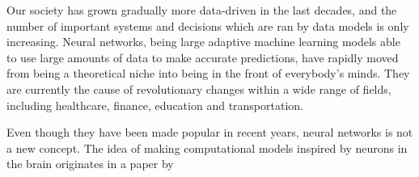 


Our society has grown gradually more data-driven in the last decades, and the number of important systems and decisions which are ran by data models is only increasing.
Neural networks, being large adaptive machine learning models able to use large amounts of data to make accurate predictions, have rapidly moved from being a theoretical niche into being in the front of everybody's minds.
They are currently the cause of revolutionary changes within a wide range of fields, including healthcare, finance, education and transportation.

Even though they have been made popular in recent years, neural networks is not a new concept.
The idea of making computational models inspired by neurons in the brain originates in a paper by 